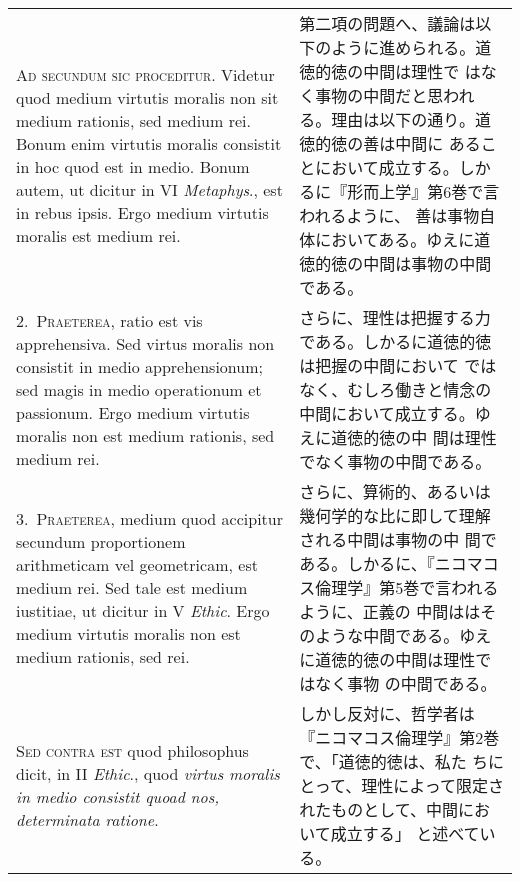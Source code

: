 \documentclass[10pt]{jsarticle}
\begin{document}
\begin{longtable}{p{21em}p{21em}}
{\scshape Ad secundum sic proceditur}. Videtur quod medium virtutis
moralis non sit medium rationis, sed medium rei. Bonum enim virtutis
moralis consistit in hoc quod est in medio. Bonum autem, ut dicitur in
VI {\itshape Metaphys}., est in rebus ipsis. Ergo medium virtutis
moralis est medium rei.


&

 第二項の問題へ、議論は以下のように進められる。道徳的徳の中間は理性で
 はなく事物の中間だと思われる。理由は以下の通り。道徳的徳の善は中間に
 あることにおいて成立する。しかるに『形而上学』第6巻で言われるように、
 善は事物自体においてある。ゆえに道徳的徳の中間は事物の中間である。

 
\\

2.~{\scshape Praeterea}, ratio est vis apprehensiva. Sed virtus
moralis non consistit in medio apprehensionum; sed magis in medio
operationum et passionum. Ergo medium virtutis moralis non est medium
rationis, sed medium rei.

&

 さらに、理性は把握する力である。しかるに道徳的徳は把握の中間において
 ではなく、むしろ働きと情念の中間において成立する。ゆえに道徳的徳の中
 間は理性でなく事物の中間である。

\\

3.~{\scshape Praeterea}, medium quod accipitur secundum proportionem
arithmeticam vel geometricam, est medium rei. Sed tale est medium
iustitiae, ut dicitur in V {\itshape Ethic}. Ergo medium virtutis
moralis non est medium rationis, sed rei.

&

 さらに、算術的、あるいは幾何学的な比に即して理解される中間は事物の中
 間である。しかるに、『ニコマコス倫理学』第5巻で言われるように、正義の
 中間ははそのような中間である。ゆえに道徳的徳の中間は理性ではなく事物
 の中間である。


\\


{\scshape Sed contra est} quod philosophus dicit, in II {\itshape
Ethic}., quod {\itshape virtus moralis in medio consistit quoad nos,
determinata ratione}.


&

 しかし反対に、哲学者は『ニコマコス倫理学』第2巻で、「道徳的徳は、私た
 ちにとって、理性によって限定されたものとして、中間において成立する」
 と述べている。

\\





\end{longtable}
\end{document}
